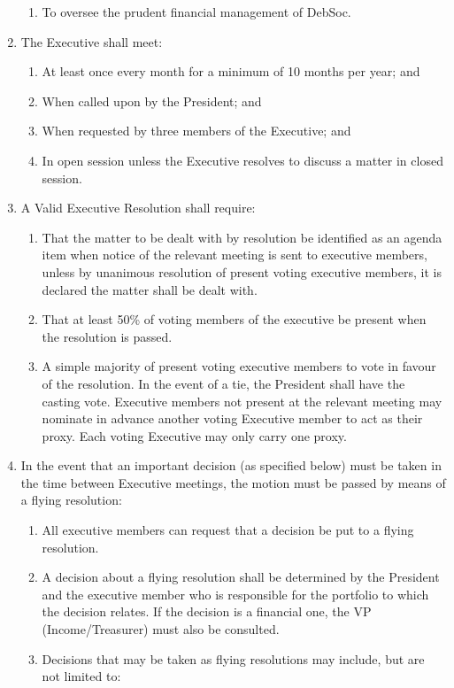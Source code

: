 \begin{enumerate}
\begin{enumerate}
  \item To oversee the prudent financial management of DebSoc.
  \end{enumerate}
\item The Executive shall meet:
  \begin{enumerate}
  \item At least once every month for a minimum of 10 months per year; and
  \item When called upon by the President; and
  \item When requested by three members of the Executive; and
  \item In open session unless the Executive resolves to discuss a matter in closed session.
  \end{enumerate}
\item A Valid Executive Resolution shall require:
  \begin{enumerate}
  \item That the matter to be dealt with by resolution be identified as an agenda item when notice of the relevant meeting is sent to executive members, unless by unanimous resolution of present voting executive members, it is declared the matter shall be dealt with.
  \item That at least 50\% of voting members of the executive be present when the resolution is passed.
  \item A simple majority of present voting executive members to vote in favour of the resolution. In the event of a tie, the President shall have the casting vote. Executive members not present at the relevant meeting may nominate in advance another voting Executive member to act as their proxy. Each voting Executive may only carry one proxy.
  \end{enumerate}
\item In the event that an important decision (as specified below) must be taken in the time between Executive meetings, the motion must be passed by means of a flying resolution: \label{flying_resolution}
  \begin{enumerate}
  \item All executive members can request that a decision be put to a flying resolution.
  \item A decision about a flying resolution shall be determined by the President and the executive member who is responsible for the portfolio to which the decision relates. If the decision is a financial one, the VP (Income/Treasurer) must also be consulted.
  \item Decisions that may be taken as flying resolutions may include, but are not limited to:

\end{enumerate}
\end{enumerate}
